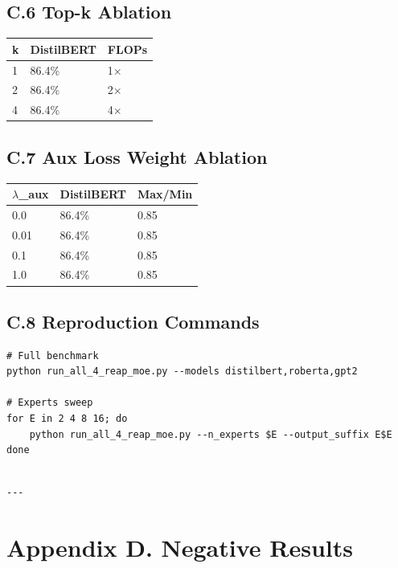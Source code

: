 \subsection{C.6 Top-k Ablation}

\begin{table}[H]
\centering
\small
\begin{tabular}{lll}
\toprule
\textbf{k} & \textbf{DistilBERT} & \textbf{FLOPs} \\
\midrule
1 & 86.4\% & 1$\times$ \\
2 & 86.4\% & 2$\times$ \\
4 & 86.4\% & 4$\times$ \\
\bottomrule
\end{tabular}
\end{table}

\subsection{C.7 Aux Loss Weight Ablation}

\begin{table}[H]
\centering
\small
\begin{tabular}{lll}
\toprule
\textbf{$\lambda$\_aux} & \textbf{DistilBERT} & \textbf{Max/Min} \\
\midrule
0.0 & 86.4\% & 0.85 \\
0.01 & 86.4\% & 0.85 \\
0.1 & 86.4\% & 0.85 \\
1.0 & 86.4\% & 0.85 \\
\bottomrule
\end{tabular}
\end{table}

\subsection{C.8 Reproduction Commands}

\begin{lstlisting}
# Full benchmark
python run_all_4_reap_moe.py --models distilbert,roberta,gpt2

# Experts sweep
for E in 2 4 8 16; do
    python run_all_4_reap_moe.py --n_experts $E --output_suffix E$E
done
\end{lstlisting}
\begin{lstlisting}

---
\end{lstlisting}

\section{Appendix D. Negative Results}

